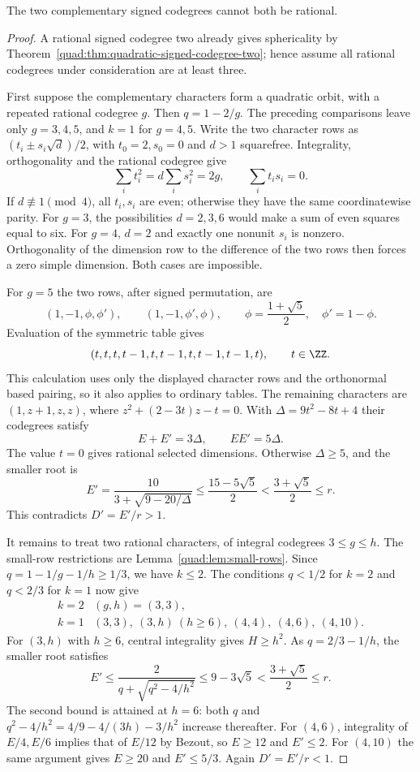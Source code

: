 \begin{lemma}\label{qs:rational-complement}
The two complementary signed codegrees cannot both be rational.
\end{lemma}
\begin{proof}
A rational signed codegree two already gives sphericality by
Theorem~\ref{quad:thm:quadratic-signed-codegree-two}; hence assume all
rational codegrees under consideration are at least three.

First suppose the complementary characters form a quadratic orbit,
with a repeated rational codegree $g$. Then $q=1-2/g$.
The preceding comparisons leave only $g=3,4,5$, and $k=1$ for
$g=4,5$. Write the two character rows as
$(t_i\pm s_i\sqrt d)/2$, with $t_0=2,s_0=0$ and $d>1$ squarefree.
Integrality, orthogonality and the rational codegree give
\[
 \sum_i t_i^2=d\sum_i s_i^2=2g,\qquad
 \sum_i t_i s_i=0.
\]
If $d\not\equiv1\pmod4$, all $t_i,s_i$ are even; otherwise they
have the same coordinatewise parity. For $g=3$, the possibilities
$d=2,3,6$ would make a sum of even squares equal to six. For $g=4$,
$d=2$ and exactly one nonunit $s_i$ is nonzero. Orthogonality of the
dimension row to the difference of the two rows then forces a zero
simple dimension. Both cases are impossible.

For $g=5$ the two rows, after signed permutation, are
\[
 (1,-1,\phi,\phi'),\qquad(1,-1,\phi',\phi),
 \qquad \phi=\frac{1+\sqrt5}{2},\quad\phi'=1-\phi.
\]
Evaluation of the symmetric table gives
\begin{equation}\label{quad:eq:constant-five-normal-form}
(t,t,t,t-1,t,t-1,t,t-1,t-1,t),\qquad t\in\ZZ.
\end{equation}
This calculation uses only the displayed character rows and the
orthonormal based pairing, so it also applies to ordinary tables.
The remaining characters are $(1,z+1,z,z)$, where
$z^2+(2-3t)z-t=0$. With $\Delta=9t^2-8t+4$ their codegrees satisfy
\[
 E+E'=3\Delta,\qquad EE'=5\Delta.
\]
The value $t=0$ gives rational selected dimensions. Otherwise
$\Delta\ge5$, and the smaller root is
\[
 E'=\frac{10}{3+\sqrt{9-20/\Delta}}
 \le\frac{15-5\sqrt5}{2}<\frac{3+\sqrt5}{2}\le r.
\]
This contradicts $D'=E'/r>1$.

It remains to treat two rational characters, of integral codegrees
$3\le g\le h$. The small-row restrictions are
Lemma~\ref{quad:lem:small-rows}. Since $q=1-1/g-1/h\ge1/3$, we have $k\le2$.
The conditions $q<1/2$ for $k=2$ and $q<2/3$ for $k=1$ now give
\[
\begin{array}{c|l}
k=2&(g,h)=(3,3),\\
k=1&(3,3),\ (3,h)\ (h\ge6),\ (4,4),\ (4,6),\ (4,10).
\end{array}
\]
For $(3,h)$ with $h\ge6$, central integrality gives $H\ge h^2$.
As $q=2/3-1/h$, the smaller root satisfies
\[
 E'\le\frac2{q+\sqrt{q^2-4/h^2}}
 \le9-3\sqrt5<\frac{3+\sqrt5}{2}\le r.
\]
The second bound is attained at $h=6$: both $q$ and
$q^2-4/h^2=4/9-4/(3h)-3/h^2$ increase thereafter.
For $(4,6)$, integrality of $E/4,E/6$ implies that of $E/12$ by
Bezout, so $E\ge12$ and $E'\le2$. For $(4,10)$ the same argument
gives $E\ge20$ and $E'\le5/3$. Again $D'=E'/r<1$.


\end{proof}
